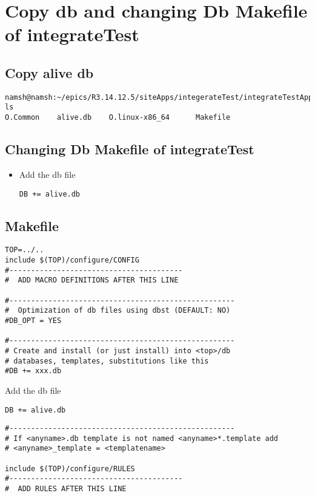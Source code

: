 \documentclass[11pt
  , a4paper
  , article
  , oneside
]{memoir}
\begin{document}
\section{Copy db and changing Db Makefile of integrateTest}
\subsection{Copy alive db}
\begin{lstlisting}[style=termstyle]
namsh@namsh:~/epics/R3.14.12.5/siteApps/integerateTest/integrateTestApp/Db$ ls
O.Common	alive.db	O.linux-x86_64		Makefile
\end{lstlisting}
\subsection{Changing Db Makefile of integrateTest}
\begin{itemize}
	\item Add the db file
	\begin{lstlisting}[style=termstyle]
DB += alive.db
\end{lstlisting}
\end{itemize}
\subsection{Makefile}
\begin{lstlisting}[style=termstyle]
TOP=../..
include $(TOP)/configure/CONFIG
#----------------------------------------
#  ADD MACRO DEFINITIONS AFTER THIS LINE

#----------------------------------------------------
#  Optimization of db files using dbst (DEFAULT: NO)
#DB_OPT = YES

#----------------------------------------------------
# Create and install (or just install) into <top>/db
# databases, templates, substitutions like this
#DB += xxx.db
\end{lstlisting}
Add the db file
\begin{lstlisting}[style=termstyle]
DB += alive.db
\end{lstlisting}
\begin{lstlisting}[style=termstyle]
#----------------------------------------------------
# If <anyname>.db template is not named <anyname>*.template add
# <anyname>_template = <templatename>

include $(TOP)/configure/RULES
#----------------------------------------
#  ADD RULES AFTER THIS LINE
\end{lstlisting}
\end{document}
